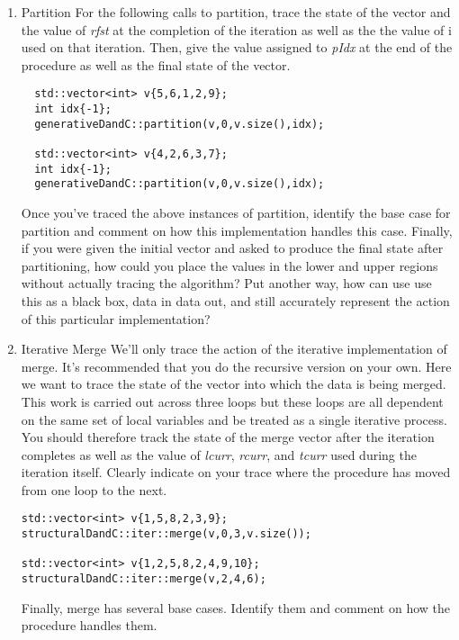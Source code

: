 \documentclass[10pt]{article}
\begin{document}
\begin{enumerate}
\newpage \thispagestyle{empty}
\hspace{1in}
\newpage \thispagestyle{empty}

\item Partition \newline
For the following calls to partition, trace the state of the vector and the value of \textit{rfst} at the completion of the iteration as well as the the value of i used on that iteration. Then, give the value assigned to \textit{pIdx} at the end of the procedure as well as the final state of the vector.
\begin{lstlisting}
  std::vector<int> v{5,6,1,2,9};
  int idx{-1};
  generativeDandC::partition(v,0,v.size(),idx);

  std::vector<int> v{4,2,6,3,7};
  int idx{-1};
  generativeDandC::partition(v,0,v.size(),idx);
\end{lstlisting}
Once you've traced the above instances of partition, identify the base case for partition and comment on how this implementation handles this case. Finally, if you were given the initial vector and asked to produce the final state after partitioning, how could you place the values in the lower and upper regions without actually tracing the algorithm? Put another way, how can use use this as a black box, data in data out, and still accurately represent the action of this particular implementation?

\newpage \thispagestyle{empty}
\hspace{1in}
\newpage \thispagestyle{empty}

\item Iterative Merge \newline
We'll only trace the action of the iterative implementation of merge. It's recommended that you do the recursive version on your own. Here we want to trace the state of the vector into which the data is being merged. This work is carried out across three loops but these loops are all dependent on the same set of local variables and be treated as a single iterative process. You should therefore track the state of the merge vector  after the iteration completes as well as the value of \textit{lcurr}, \textit{rcurr}, and \textit{tcurr} used during the iteration itself. Clearly indicate on your trace where the procedure has moved from one loop to the next.
\begin{lstlisting}
std::vector<int> v{1,5,8,2,3,9};
structuralDandC::iter::merge(v,0,3,v.size());

std::vector<int> v{1,2,5,8,2,4,9,10};
structuralDandC::iter::merge(v,2,4,6);
\end{lstlisting}
Finally, merge has several base cases. Identify them and comment on how the procedure handles them.

\newpage \thispagestyle{empty}
\hspace{1in}
\newpage \thispagestyle{empty}

\end{enumerate}
\end{document}
